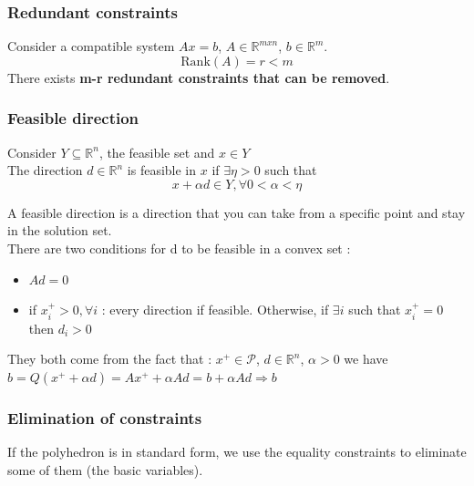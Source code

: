 \documentclass[../main.tex]{subfiles}
\begin{document}
\subsubsection{Redundant constraints}
\begin{theoremen}
    Consider a compatible system $Ax=b$, $A \in \mathbb{R}^{mxn}$, $b\in \mathbb{R}^m$.\\
\begin{equation}
    \text{Rank}(A) = r<m
\end{equation}
There exists \textbf{m-r redundant constraints that can be removed}.\\
\end{theoremen}

\subsubsection{Feasible direction}
Consider $Y \subseteq \mathbb{R}^n$, the feasible set and $x\in Y$\\
The direction $d\in \mathbb{R}^n$ is feasible in $x$ if $\exists \eta>0$ such that \begin{equation}
    x+\alpha d \in Y, \forall 0<\alpha<\eta
\end{equation}

A feasible direction is a direction that you can take from a specific point and stay in the solution set.\\

There are two conditions for d to be feasible in a convex set : \begin{itemize}
    \item $Ad = 0$\\
    \item if $x_i^+ >0, \forall i$ : every direction if feasible. Otherwise, if $\exists i$ such that $x_i^+ = 0$ then $d_i>0$
\end{itemize}
They both come from the fact that : $x^+\in \mathcal{P}$, $d\in \mathbb{R}^n$, $\alpha >0$ we have $b = Q(x^+ + \alpha d) = Ax^+ + \alpha A d = b + \alpha A d \Rightarrow b$\\

\subsubsection{Elimination of constraints}
If the polyhedron is in standard form, we use the equality constraints to eliminate some of them (the basic variables).\\
\end{document}
